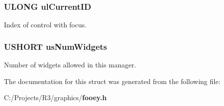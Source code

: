 \subsubsection[{ulCurrentID}]{\setlength{\rightskip}{0pt plus 5cm}ULONG {\bf ulCurrentID}}\label{struct_g_u_i___m_a_n_a_g_e_r___s_t_r_u_c_t_afffafbda66314730e84c689b48a9b207}


Index of control with focus. 
\subsubsection[{usNumWidgets}]{\setlength{\rightskip}{0pt plus 5cm}USHORT {\bf usNumWidgets}}\label{struct_g_u_i___m_a_n_a_g_e_r___s_t_r_u_c_t_a590bd1019f7c2dbec2f59b621165dfd0}


Number of widgets allowed in this manager. 

The documentation for this struct was generated from the following file:\begin{DoxyCompactItemize}
\item 
C:/Projects/R3/graphics/{\bf fooey.h}\end{DoxyCompactItemize}
